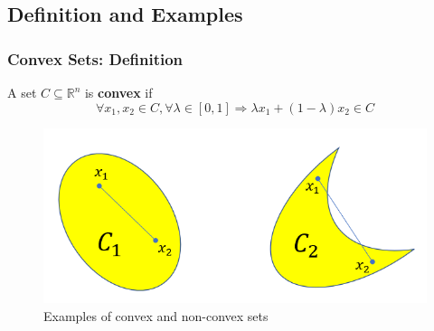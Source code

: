 \subsection{Definition and Examples}
\begin{frame}\frametitle{Convex Sets: Definition}
    \begin{definition}
     A set $C \subseteq \mathbb{R}^n$ is \textbf{convex} if 
    \begin{equation*}
        \forall x_1, x_2 \in C, \forall \lambda \in [0,1] \Rightarrow \lambda x_1 + (1 - \lambda) x_2 \in C
    \end{equation*}
    \end{definition}

    \hspace{10mm}
    \begin{figure}
    \includegraphics[scale=0.5]{./figures/convex_nonconvex_examples.png}
    \caption{Examples of convex and non-convex sets}
    \end{figure}
\end{frame}

